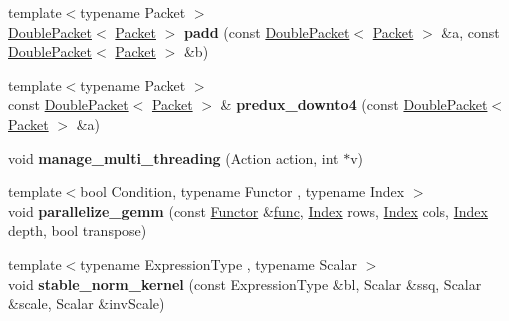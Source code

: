 \begin{DoxyCompactItemize}
\mbox{\label{namespace_eigen_1_1internal_ae8e5c3ac364c34e1d86f4a82359558ae}} 
{\footnotesize template$<$typename Packet $>$ }\\\hyperlink{struct_eigen_1_1internal_1_1_double_packet}{Double\+Packet}$<$ \hyperlink{union_eigen_1_1internal_1_1_packet}{Packet} $>$ {\bfseries padd} (const \hyperlink{struct_eigen_1_1internal_1_1_double_packet}{Double\+Packet}$<$ \hyperlink{union_eigen_1_1internal_1_1_packet}{Packet} $>$ \&a, const \hyperlink{struct_eigen_1_1internal_1_1_double_packet}{Double\+Packet}$<$ \hyperlink{union_eigen_1_1internal_1_1_packet}{Packet} $>$ \&b)
\item 
\mbox{\label{namespace_eigen_1_1internal_ae298fdf52ed1841e9857aeaaf28fc6bc}} 
{\footnotesize template$<$typename Packet $>$ }\\const \hyperlink{struct_eigen_1_1internal_1_1_double_packet}{Double\+Packet}$<$ \hyperlink{union_eigen_1_1internal_1_1_packet}{Packet} $>$ \& {\bfseries predux\+\_\+downto4} (const \hyperlink{struct_eigen_1_1internal_1_1_double_packet}{Double\+Packet}$<$ \hyperlink{union_eigen_1_1internal_1_1_packet}{Packet} $>$ \&a)
\item 
\mbox{\label{namespace_eigen_1_1internal_a6e841e3c4f4914cf1e06704ec8537db3}} 
void {\bfseries manage\+\_\+multi\+\_\+threading} (Action action, int $\ast$v)
\item 
\mbox{\label{namespace_eigen_1_1internal_a2a7e89a0df89d06dd95f0c3dda17cf3e}} 
{\footnotesize template$<$bool Condition, typename Functor , typename Index $>$ }\\void {\bfseries parallelize\+\_\+gemm} (const \hyperlink{struct_functor}{Functor} \&\hyperlink{structfunc}{func}, \hyperlink{namespace_eigen_a62e77e0933482dafde8fe197d9a2cfde}{Index} rows, \hyperlink{namespace_eigen_a62e77e0933482dafde8fe197d9a2cfde}{Index} cols, \hyperlink{namespace_eigen_a62e77e0933482dafde8fe197d9a2cfde}{Index} depth, bool transpose)
\item 
\mbox{\label{namespace_eigen_1_1internal_a9478a4692dc32c5b5a14c9c6e462c3fc}} 
{\footnotesize template$<$typename Expression\+Type , typename Scalar $>$ }\\void {\bfseries stable\+\_\+norm\+\_\+kernel} (const Expression\+Type \&bl, Scalar \&ssq, Scalar \&scale, Scalar \&inv\+Scale)

\end{DoxyCompactItemize}
